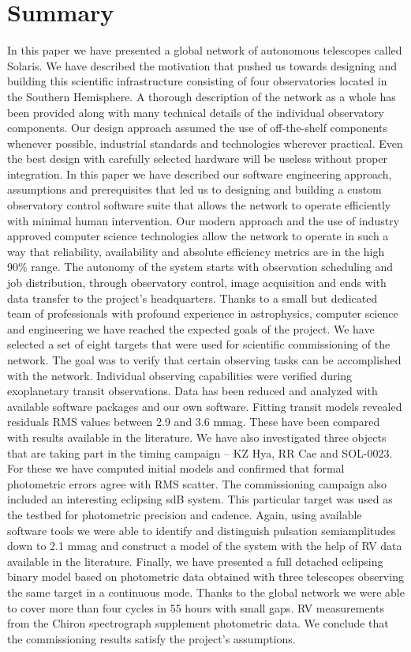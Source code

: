 \section{Summary}
\label{sec:Summary}

In this paper we have presented a global network of autonomous telescopes called Solaris. We have described the motivation that pushed us towards designing and building this scientific infrastructure consisting of four observatories located in the Southern Hemisphere. A thorough description of the network as a whole has been provided along with many technical details of the individual observatory components. Our design approach assumed the use of off-the-shelf components whenever possible, industrial standards and technologies wherever practical. Even the best design with carefully selected hardware will be useless without proper integration. In this paper we have described our software engineering approach, assumptions and prerequisites that led us to designing and building a custom observatory control software suite that allows the network to operate efficiently with minimal human intervention. Our modern approach and the use of industry approved computer science technologies allow the network to operate in such a way that reliability, availability and absolute efficiency metrics are in the high 90\% range. The autonomy of the system starts with observation scheduling and job distribution, through observatory control, image acquisition and ends with data transfer to the project's headquarters. Thanks to a small but dedicated team of professionals with profound experience in astrophysics, computer science and engineering we have reached the expected goals of the project. We have selected a set of eight targets that were used for scientific commissioning of the network. The goal was to verify that certain observing tasks can be accomplished with the network. Individual observing capabilities were verified during exoplanetary transit observations. Data has been reduced and analyzed with available software packages and our own software. Fitting transit models revealed residuals RMS values between 2.9 and 3.6 mmag. These have been compared with results available in the literature. We have also investigated three objects that are taking part in the timing campaign -- KZ Hya, RR Cae and SOL-0023. For these we have computed initial models and confirmed that formal photometric errors agree with RMS scatter. The commissioning campaign also included an interesting eclipsing sdB system. This particular target was used as the testbed for photometric precision and cadence. Again, using available software tools we were able to identify and distinguish pulsation semiamplitudes down to 2.1 mmag and construct a model of the system with the help of RV data available in the literature. Finally, we have presented a full detached eclipsing binary model based on photometric data obtained with three telescopes observing the same target in a continuous mode. Thanks to the global network we were able to cover more than four cycles in 55 hours with small gaps. RV measurements from the Chiron spectrograph supplement photometric data. We conclude that the commissioning results satisfy the project's assumptions.

